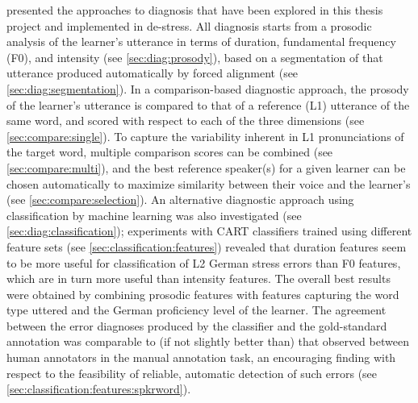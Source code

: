%
%
 presented the approaches to diagnosis that have been explored in this thesis project and implemented in de-stress. All diagnosis starts from a prosodic analysis of the learner's utterance in terms of duration, fundamental frequency (F0), and intensity (see \cref{sec:diag:prosody}), based on a segmentation of that utterance produced automatically by forced alignment (see \cref{sec:diag:segmentation}). 
	In a comparison-based diagnostic approach, the prosody of the learner's utterance is compared to that of a reference (L1) utterance of the same word, and scored with respect to each of the three dimensions (see \cref{sec:compare:single}). 
	To capture the variability inherent in L1 pronunciations of the target word, multiple comparison scores 
	can be combined (see \cref{sec:compare:multi}), and the best reference speaker(s) for a given learner can be chosen automatically to maximize similarity between their voice and the learner's (see \cref{sec:compare:selection}). 
	An alternative diagnostic approach using classification by machine learning was also investigated (see \cref{sec:diag:classification});
	experiments with CART classifiers trained using different feature sets (see \cref{sec:classification:features}) revealed that duration features seem to be more useful for classification of L2 German stress errors than F0 features, which are in turn more useful than intensity features. The overall best results were obtained by  combining prosodic features with features capturing the word type uttered and the German proficiency level of the learner. 
	The agreement between the error diagnoses produced by the classifier and the gold-standard annotation was comparable to (if not slightly better than) that observed between human annotators in the manual annotation task, an encouraging finding with respect to the feasibility of reliable, automatic detection of such errors (see \cref{sec:classification:features:spkrword}). 
